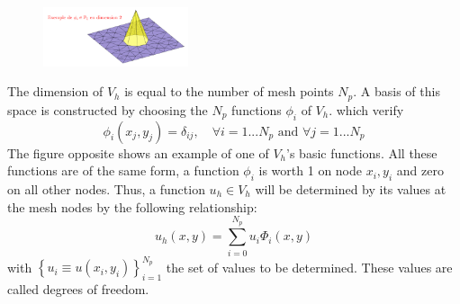 \documentclass[english,10pt,a4paper]{article}
\begin{document}
\paragraph{}
\begin{figure}
  \centering
  \includegraphics[width=0.38\textwidth]{images/fonction_base_P1.png}
\end{figure}
The dimension of $V_h$ is equal to the number of mesh points $N_p$. A basis of this space is constructed by choosing the $N_p$ functions $\phi_i$ of $V_h$.
which verify
\begin{equation*}
  \phi_i(x_j,y_j) = \delta_{ij}, \quad \forall i=1...N_p \text{ and } \forall j=1...N_p
\end{equation*}
The figure opposite shows an example of one of $V_h$'s basic functions. All these functions are of the same form, a function $\phi_i$ is worth 1 on node $x_i,y_i$ and zero on all other nodes.
Thus, a function $u_h \in V_h$ will be determined by its values at the mesh nodes by the following relationship:
\begin{equation*}
  u_h(x,y) = \sum_{i=0}^{N_p} u_i \Phi_i (x,y)
\end{equation*}
with $\left\{u_i \equiv u(x_i,y_i)\right\}_{i=1}^{N_p}$ the set of values to be determined. These values are called degrees of freedom.
\end{document}
